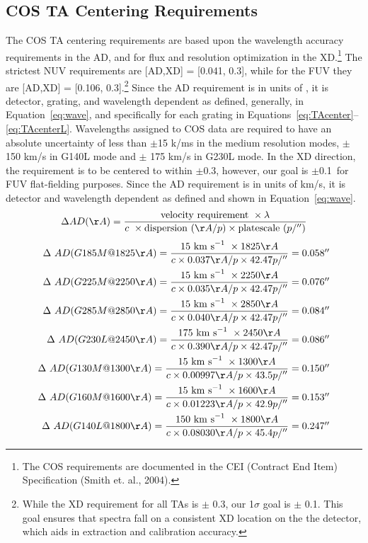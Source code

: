 \subsection{COS TA Centering Requirements}\label{subsec:requirements}

The COS TA centering requirements are based upon the wavelength accuracy requirements in the AD, and for flux and resolution optimization
in the XD.\footnote{The COS requirements are documented in the CEI (Contract End Item) Specification (Smith et. al., 2004).} The strictest NUV requirements are [AD,XD] = [0.041, 0.3]\arcsec, while for the FUV they are [AD,XD] = [0.106, 0.3]\arcsec.\footnote{While the XD requirement for all TAs is $\pm$ 0.3\arcsec, our 1$\sigma$ goal is $\pm$ 0.1\arcsec. This goal ensures that spectra fall on a consistent XD location on the the detector, which aids in extraction and calibration accuracy.}
Since the AD requirement is in units of \kmsno, it is detector, grating, and wavelength dependent as defined, generally, in Equation~\ref{eq:wave}, and specifically
for each grating in Equations~\ref{eq:TAcenter}--\ref{eq:TAcenterL}.
Wavelengths assigned to COS data are required to have an absolute uncertainty of less than $\pm$15 k/ms in the medium resolution modes, $\pm$150 km/s in G140L mode and $\pm$ 175 km/s in G230L mode.
In the XD direction, the requirement is to be centered to within $\pm$0.3\arcsec, however, our goal is $\pm$0.1\arcsec\ for FUV flat-fielding purposes.
Since the AD requirement is in units of km/s, it is detector and wavelength dependent as defined and shown in Equation~\ref{eq:wave}.\\
\begin{equation}
\Delta AD (\AA) ={ {{\rm velocity\ requirement}\ \times \lambda}\over{ c~\times {\rm dispersion}\ (\AA/p) \times {\rm platescale}\ (p/\arcsec)}}
\label{eq:wave}
\end{equation}
\begin{eqnarray}\label{eq:TAcenter}
\Delta\ AD(G185M@1825\AA) = {{ 15\kms \times 1825\AA}\over{c \times 0 .037\AA/p\times 42.47 p/\arcsec}}  = 0.058\arcsec\\
\Delta\ AD(G225M@2250\AA) = {{ 15\kms \times 2250\AA}\over{c \times  0.035\AA/p\times 42.47 p/\arcsec}}  = 0.076\arcsec\\
\Delta\ AD(G285M@2850\AA) = {{ 15\kms \times 2850\AA}\over{c \times  0.040\AA/p\times 42.47 p/\arcsec}}  = 0.084\arcsec\\
\Delta\ AD(G230L@2450\AA) = {{175\kms \times 2450\AA}\over{c \times  0.390\AA/p\times 42.47 p/\arcsec}}  = 0.086\arcsec\\
\Delta\ AD(G130M@1300\AA) = {{ 15\kms \times 1300\AA}\over{c \times 0.00997\AA/ p\times 43.5 p/\arcsec}} = 0.150\arcsec\\
\Delta\ AD(G160M@1600\AA) = {{ 15\kms \times 1600\AA}\over{c \times 0.01223\AA/ p\times 42.9 p/\arcsec}} = 0.153\arcsec\\
\Delta\ AD(G140L@1800\AA) = {{150\kms \times 1800\AA}\over{c \times 0.08030\AA/ p\times 45.4 p/\arcsec}} = 0.247\arcsec\label{eq:TAcenterL}
\end{eqnarray}
\normalsize

